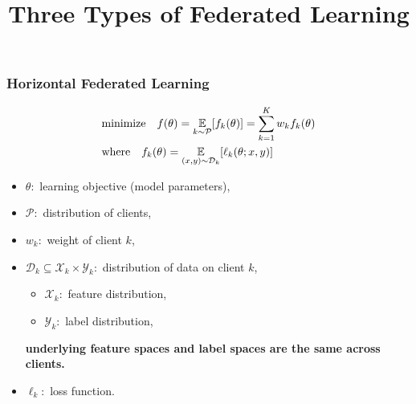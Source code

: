 \showtocfalse




\title[3 Types of FL]{Three Types of Federated Learning}
\date{}



\setlength{\belowdisplayskip}{5pt} \setlength{\belowdisplayshortskip}{5pt}
\setlength{\abovedisplayskip}{5pt} \setlength{\abovedisplayshortskip}{5pt}


\begin{frame}
\titlepage %
\end{frame}


\begin{frame}
\frametitle{Horizontal Federated Learning}

\begin{align*}
    & \text{minimize} \quad f(\theta) = \operatorname*{\mathbb{E}}\limits_{k \sim {\mathcal{P}}} [f_k(\theta)] = \sum_{k=1}^K w_k f_k(\theta) \\
    & \text{where} \quad f_k(\theta) = \operatorname*{\mathbb{E}}\limits_{(x, y) \sim \mathcal{D}_k} [\ell_k(\theta; x, y)]
\end{align*}

\begin{itemize}
\item $\theta:$ learning objective (model parameters),
\item $\mathcal{P}:$ distribution of clients,
\item $w_k:$ weight of client $k$,
\item $\mathcal{D}_k \subseteq \mathcal{X}_k \times \mathcal{Y}_k:$ distribution of data on client $k$,
\begin{itemize}
    \item $\mathcal{X}_k:$ feature distribution,
    \item $\mathcal{Y}_k:$ label distribution,
\end{itemize}
\textbf{underlying feature spaces and label spaces are the same across clients.}
\item $\ell_k:$ loss function.
\end{itemize}

\end{frame}


